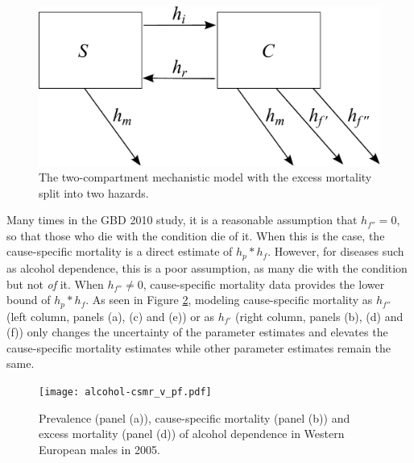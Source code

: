     \begin{figure}[h]
        \begin{center}
            \includegraphics[width=\textwidth]{SC2.pdf}
            \caption{The two-compartment mechanistic model with the excess mortality split into two hazards.}
            \label{fig:two_compartment_2f}
        \end{center}
    \end{figure}

Many times in the GBD 2010 study, it is a reasonable assumption that $h_{f''} = 0$, so that those who die with the condition die of it.  When this is the case, the cause-specific mortality is a direct estimate of $h_{p}*h_{f}$.  However, for diseases such as alcohol dependence, this is a poor assumption, as many die with the condition but not \emph{of} it.  When $h_{f''} \neq 0$, cause-specific mortality data provides the lower bound of $h_{p}*h_{f}$.  As seen in Figure \ref{fig:app-alcohol compare}, modeling cause-specific mortality as $h_{f''}$ (left column, panels (a), (c) and (e)) or as $h_{f'}$ (right column, panels (b), (d) and (f)) only changes the uncertainty of the parameter estimates and elevates the cause-specific mortality estimates while other parameter estimates remain the same.

    \begin{figure}[h]
        \begin{center}
            \texttt{[image: alcohol-csmr\_v\_pf.pdf]}
            \caption{Prevalence (panel (a)), cause-specific mortality (panel (b)) and excess mortality (panel (d)) of alcohol dependence in Western European males in 2005.}
            \label{fig:app-alcohol compare}
        \end{center}
    \end{figure} 